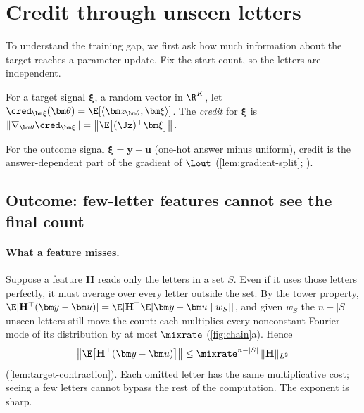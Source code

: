 \section{Credit through unseen letters}
\label{sec:credit}

To understand the training gap, we first ask how much information about the target reaches a parameter update.
Fix the start count, so the letters are independent.

\begin{definition}[Credit]
\label{def:credit}
For a target signal $\bm\xi$, a random vector in $\R^K$, let $\cred_{\bm\xi}(\bm\theta)=\E[\langle\bm z_{\bm\theta},\bm\xi\rangle]$. The
\emph{credit} for $\bm\xi$ is $\|\nabla_{\bm\theta}\cred_{\bm\xi}\|=\bigl\|\E\bigl[(\Jz)^\top\bm\xi\bigr]\bigr\|$.
\end{definition}

For the outcome signal $\bm\xi=\bm y-\bm u$ (one-hot answer minus uniform), credit is the answer-dependent part of the gradient of
$\Lout$ (\cref{lem:gradient-split}; \citealp{shalevshwartz2017failures,abbe2025parities}).

\subsection{Outcome: few-letter features cannot see the final count}
\paragraph{What a feature misses.} Suppose a feature $\mathbf H$ reads only the letters in a set $S$. Even if it uses those letters perfectly,
it must average over every letter outside the set. By the tower property,
$\E[\mathbf H^\top(\bm y-\bm u)]=\E[\mathbf H^\top\E[\bm y-\bm u\mid w_S]]$, and given $w_S$ the $n-|S|$ unseen letters still move the count: each
multiplies every nonconstant Fourier mode of its distribution by at most $\mixrate$ (\cref{fig:chain}a). Hence
\begin{equation}
 \bigl\|\E\bigl[\mathbf H^\top(\bm y-\bm u)\bigr]\bigr\|\le\mixrate^{n-|S|}\,\|\mathbf H\|_{L^2}
 \label{eq:credit-degree}
\end{equation}
(\cref{lem:target-contraction}). Each omitted letter has the same multiplicative cost; seeing a few letters cannot bypass the rest of
the computation. The exponent is sharp.

